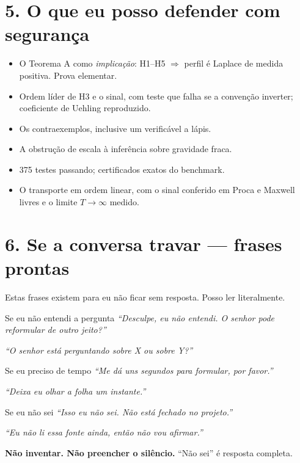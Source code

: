 \documentclass[12pt,a4paper]{article}
\newcommand{\fala}[1]{\textit{\color{ink}``#1''}}
\begin{document}
\section*{5. O que eu posso defender com segurança}

\begin{itemize}[leftmargin=6mm,itemsep=2pt]
\item O Teorema A como \emph{implicação}: H1--H5 $\Rightarrow$ perfil é Laplace
de medida positiva. Prova elementar.
\item Ordem líder de H3 e o sinal, com teste que falha se a convenção inverter;
coeficiente de Uehling reproduzido.
\item Os contraexemplos, inclusive um verificável a lápis.
\item A obstrução de escala à inferência sobre gravidade fraca.
\item 375 testes passando; certificados exatos do benchmark.
\item O transporte em ordem linear, com o sinal conferido em Proca e Maxwell
livres e o limite $T\to\infty$ medido.
\end{itemize}

\newpage

\section*{6. Se a conversa travar --- frases prontas}

Estas frases existem para eu não ficar sem resposta. Posso ler literalmente.

\begin{say}{Se eu não entendi a pergunta}
\fala{Desculpe, eu não entendi. O senhor pode reformular de outro jeito?}\par
\fala{O senhor está perguntando sobre X ou sobre Y?}
\end{say}

\begin{say}{Se eu preciso de tempo}
\fala{Me dá uns segundos para formular, por favor.}\par
\fala{Deixa eu olhar a folha um instante.}
\end{say}

\begin{say}{Se eu não sei}
\fala{Isso eu não sei. Não está fechado no projeto.}\par
\fala{Eu não li essa fonte ainda, então não vou afirmar.}\par
\textbf{Não inventar. Não preencher o silêncio.} ``Não sei'' é resposta completa.
\end{say}
\end{document}
